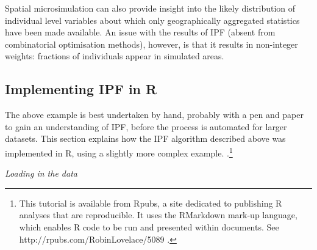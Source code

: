 \documentclass[a4paper, 11pt, twoside]{Thesis}
\begin{document}
Spatial microsimulation can also provide insight into the likely
distribution of individual level variables about which only
geographically aggregated statistics have been made available.
An issue
with the results of IPF (absent from combinatorial optimisation methods),
however, is that it results in non-integer weights: fractions of individuals
appear in simulated areas.

\subsection{Implementing IPF in R} \label{simplementing}
The above example is best undertaken by hand, probably with a pen and paper
to gain an understanding of IPF, before the process is automated for 
larger datasets. This section explains how the IPF
algorithm described above was implemented in R, using a slightly more
complex example.
\citep{Lovelace2013-trs}.\footnote{This tutorial is available from Rpubs, a site dedicated
to publishing R analyses that are reproducible. It uses the RMarkdown
mark-up language, which enables R code to be run and presented within
documents. See http://rpubs.com/RobinLovelace/5089 \label{fnrpub} .}

\emph{Loading in the data}
\end{document}
